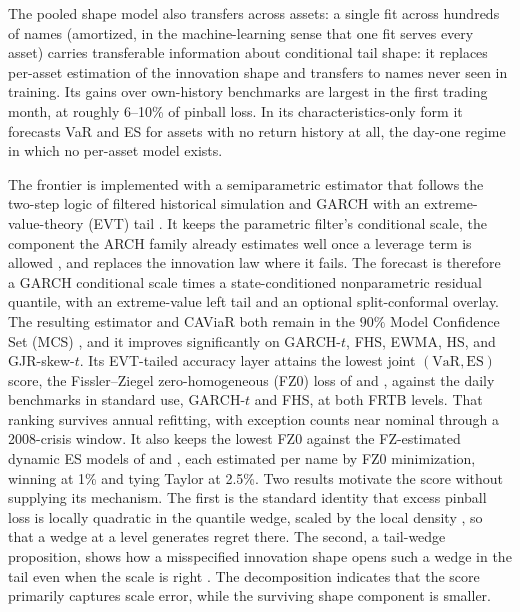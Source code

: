 \documentclass[11pt]{article}
\newcommand{\VaR}{\mathrm{VaR}}
\newcommand{\ES}{\mathrm{ES}}
\theoremstyle{remark}
\begin{document}
The pooled shape model also transfers across assets: a single fit across hundreds of names (amortized, in the machine-learning sense that one fit serves every asset) carries transferable information about conditional tail shape: it replaces per-asset estimation of the innovation shape and transfers to names never seen in training. Its gains over own-history benchmarks are largest in the first trading month, at roughly 6--10\% of pinball loss. In its characteristics-only form it forecasts VaR and ES for assets with no return history at all, the day-one regime in which no per-asset model exists.

The frontier is implemented with a semiparametric estimator that follows the two-step logic of filtered historical simulation and GARCH with an extreme-value-theory (EVT) tail \citep{baroneadesi1999fhs, mcneilfrey2000}. It keeps the parametric filter's conditional scale, the component the ARCH family already estimates well once a leverage term is allowed \citep{hansenlunde2005}, and replaces the innovation law where it fails. The forecast is therefore a GARCH conditional scale times a state-conditioned nonparametric residual quantile, with an extreme-value left tail and an optional split-conformal overlay. The resulting estimator and CAViaR \citep{engle2004caviar} both remain in the $90\%$ Model Confidence Set (MCS) \citep{hansen2011mcs}, and it improves significantly on GARCH-$t$, FHS, EWMA, HS, and GJR-skew-$t$. Its EVT-tailed accuracy layer attains the lowest joint $(\VaR,\ES)$ score, the Fissler--Ziegel zero-homogeneous (FZ0) loss of \citet{fissler2016} and \citet{patton2019}, against the daily benchmarks in standard use, GARCH-$t$ and FHS, at both FRTB levels. That ranking survives annual refitting, with exception counts near nominal through a 2008-crisis window. It also keeps the lowest FZ0 against the FZ-estimated dynamic ES models of \citet{patton2019} and \citet{taylor2019}, each estimated per name by FZ0 minimization, winning at 1\% and tying Taylor at 2.5\%. Two results motivate the score without supplying its mechanism. The first is the standard identity that excess pinball loss is locally quadratic in the quantile wedge, scaled by the local density \citep{gneiting2011, ehm2016, steinwart2011}, so that a wedge at a level generates regret there. The second, a tail-wedge proposition, shows how a misspecified innovation shape opens such a wedge in the tail even when the scale is right \citep{mcneilfrey2000, francqzakoian2015}. The decomposition indicates that the score primarily captures scale error, while the surviving shape component is smaller.
\end{document}
